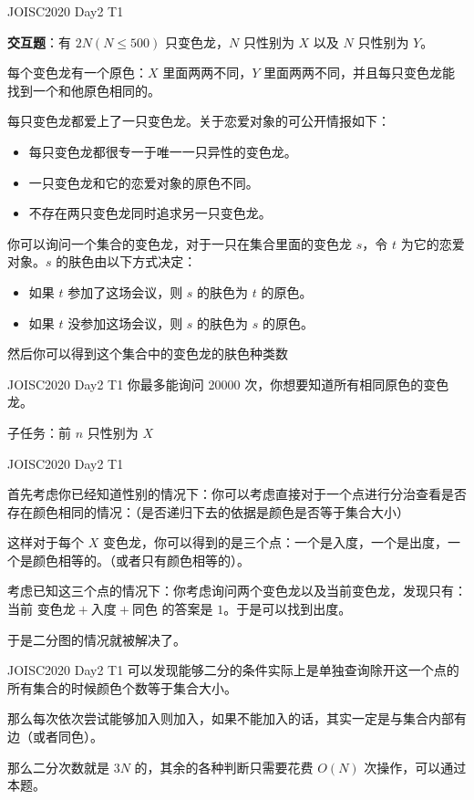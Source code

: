 \documentclass[UTF8,nofonts]{ctexbeamer}
\begin{document}
\begin{frame}{JOISC2020 Day2 T1}

\textbf{交互题}：有 $2N(N\le 500)$ 只变色龙，$N$ 只性别为 $X$ 以及 $N$ 只性别为 $Y$。

每个变色龙有一个原色：$X$ 里面两两不同，$Y$ 里面两两不同，并且每只变色龙能找到一个和他原色相同的。

每只变色龙都爱上了一只变色龙。关于恋爱对象的可公开情报如下：
\begin{itemize}
\item 每只变色龙都很专一于唯一一只异性的变色龙。
\item 一只变色龙和它的恋爱对象的原色不同。
\item 不存在两只变色龙同时追求另一只变色龙。
\end{itemize}
你可以询问一个集合的变色龙，对于一只在集合里面的变色龙 $s$，令 $t$ 为它的恋爱对象。$s$ 的肤色由以下方式决定：
\begin{itemize}
\item 如果 $t$ 参加了这场会议，则 $s$ 的肤色为 $t$ 的原色。
\item 如果 $t$ 没参加这场会议，则 $s$ 的肤色为 $s$ 的原色。
\end{itemize}

然后你可以得到这个集合中的变色龙的肤色种类数

\end{frame}

\begin{frame}{JOISC2020 Day2 T1}
你最多能询问 20000 次，你想要知道所有相同原色的变色龙。

子任务：前 $n$ 只性别为 $X$
\end{frame}

\begin{frame}{JOISC2020 Day2 T1}

首先考虑你已经知道性别的情况下：你可以考虑直接对于一个点进行分治查看是否存在颜色相同的情况：（是否递归下去的依据是颜色是否等于集合大小）\pause

这样对于每个 $X$ 变色龙，你可以得到的是三个点：一个是入度，一个是出度，一个是颜色相等的。（或者只有颜色相等的）。\pause

考虑已知这三个点的情况下：你考虑询问两个变色龙以及当前变色龙，发现只有：当前 $\text{变色龙}+\text{入度}+\text{同色}$ 的答案是 $1$。于是可以找到出度。

于是二分图的情况就被解决了。

\end{frame}

\begin{frame}{JOISC2020 Day2 T1}
可以发现能够二分的条件实际上是单独查询除开这一个点的所有集合的时候颜色个数等于集合大小。

那么每次依次尝试能够加入则加入，如果不能加入的话，其实一定是与集合内部有边（或者同色）。

那么二分次数就是 $3N$ 的，其余的各种判断只需要花费 $O(N)$ 次操作，可以通过本题。

\end{frame}
\end{document}
